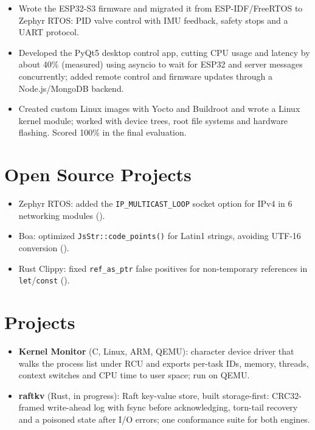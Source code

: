 \documentclass[10pt]{article}
\begin{document}
\begin{itemize}
  \item Wrote the ESP32-S3 firmware and migrated it from ESP-IDF/FreeRTOS to Zephyr RTOS: PID valve control with IMU feedback, safety stops and a UART protocol.
  \item Developed the PyQt5 desktop control app, cutting CPU usage and latency by about 40\% (measured) using asyncio to wait for ESP32 and server messages concurrently; added remote control and firmware updates through a Node.js/MongoDB backend.
\end{itemize}
\begin{itemize}
  \item Created custom Linux images with Yocto and Buildroot and wrote a Linux kernel module; worked with device trees, root file systems and hardware flashing. Scored 100\% in the final evaluation.
\end{itemize}

\section*{Open Source Projects}
\begin{itemize}
  \item Zephyr RTOS: added the \texttt{IP\_MULTICAST\_LOOP} socket option for IPv4 in 6 networking modules ().
  \item Boa: optimized \texttt{JsStr::code\_points()} for Latin1 strings, avoiding UTF-16 conversion ().
  \item Rust Clippy: fixed \texttt{ref\_as\_ptr} false positives for non-temporary references in \texttt{let}/\texttt{const} ().
\end{itemize}

\section*{Projects}
\begin{itemize}
  \item \textbf{Kernel Monitor} (C, Linux, ARM, QEMU): character device driver that walks the process list under RCU and exports per-task IDs, memory, threads, context switches and CPU time to user space; run on QEMU. 
  \item \textbf{raftkv} (Rust, in progress): Raft key-value store, built storage-first: CRC32-framed write-ahead log with fsync before acknowledging, torn-tail recovery and a poisoned state after I/O errors; one conformance suite for both engines. 
\end{itemize}
\end{document}
